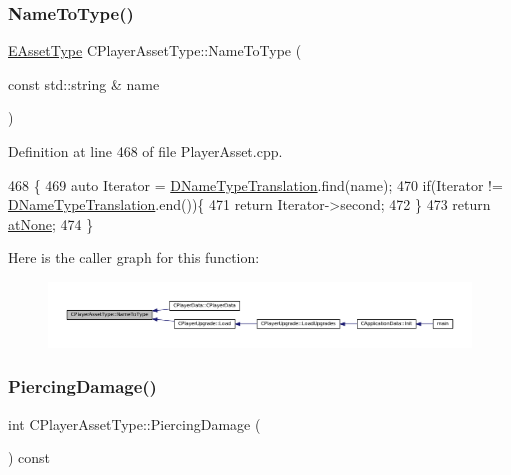 \subsubsection{\texorpdfstring{Name\+To\+Type()}{NameToType()}}
{\footnotesize\ttfamily \hyperlink{GameDataTypes_8h_a5600d4fc433b83300308921974477fec}{E\+Asset\+Type} C\+Player\+Asset\+Type\+::\+Name\+To\+Type (\begin{DoxyParamCaption}\item[{const std\+::string \&}]{name }\end{DoxyParamCaption})\hspace{0.3cm}{\ttfamily [static]}}



Definition at line 468 of file Player\+Asset.\+cpp.


\begin{DoxyCode}
468                                                             \{
469     \textcolor{keyword}{auto} Iterator = \hyperlink{classCPlayerAssetType_a4e7728e5316eb5c1124dcac90f5290d5}{DNameTypeTranslation}.find(name);
470     \textcolor{keywordflow}{if}(Iterator != \hyperlink{classCPlayerAssetType_a4e7728e5316eb5c1124dcac90f5290d5}{DNameTypeTranslation}.end())\{
471         \textcolor{keywordflow}{return} Iterator->second;
472     \}
473     \textcolor{keywordflow}{return} \hyperlink{GameDataTypes_8h_a5600d4fc433b83300308921974477feca82fb51718e2c00981a2d37bc6fe92593}{atNone};
474 \}
\end{DoxyCode}
Here is the caller graph for this function\+:\nopagebreak
\begin{figure}[H]
\begin{center}
\leavevmode
\includegraphics[width=350pt]{classCPlayerAssetType_a42d55b6d7606e021c063fce3a14c56de_icgraph}
\end{center}
\end{figure}
\hypertarget{classCPlayerAssetType_a0ccf10706b29374191644fb6ef2d4132}{}\label{classCPlayerAssetType_a0ccf10706b29374191644fb6ef2d4132} 
\subsubsection{\texorpdfstring{Piercing\+Damage()}{PiercingDamage()}}
{\footnotesize\ttfamily int C\+Player\+Asset\+Type\+::\+Piercing\+Damage (\begin{DoxyParamCaption}{ }\end{DoxyParamCaption}) const\hspace{0.3cm}{\ttfamily [inline]}}



